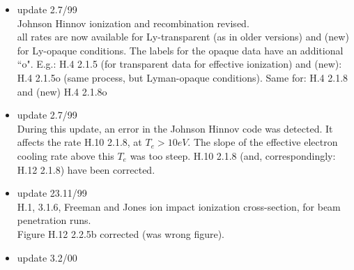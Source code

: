 \documentclass[12pt,dvipdfmx]{article}
\begin{document}
\begin{itemize}
  Fujimoto He-col.rad model revised.\\
  Form.II      ionization rate          H.4  2.3.9a, done \\
               elec. cooling rate  H.10 2.3.9a, done \\
              $\delta_E/ionis$     H.12 2.3.9a, done \\
  Form.I ionization rates revised. \\
   K1$\rightarrow$ K10=K1-K12-K13 \\
   K2$\rightarrow$ K20=K2-K21-K23 \\
   K3$\rightarrow$ K30=K3-K31-K32 \\
               H.4 2.3.9b, 2.3.9c 2.3.9d  redone \\
               (only 2.3.9b,K10, differs from earlier version)\\
               H.4 2.3.9e, 2.3.9f 2.3.9g  redone \\
               (only 2.3.9f,K20, differs from earlier version)\\
               H.4 2.3.9h, 2.3.9i 2.3.9j  redone \\
               (only 2.3.9j,K30, differs from earlier version)\\
 \item update   2.7/99 \\
  Johnson Hinnov ionization and recombination revised.\\
  all rates are now available for Ly-transparent (as in older versions)
  and (new) for Ly-opaque conditions. The labels for the opaque
  data have an additional ``o". E.g.: H.4 2.1.5 (for transparent
  data for effective ionization) and (new): H.4 2.1.5o (same process,
  but Lyman-opaque conditions). Same for: H.4 2.1.8 and (new) H.4 2.1.8o
 \item update   2.7/99 \\
  During this update, an error in the Johnson Hinnov code was detected.
  It affects the rate H.10 2.1.8, at $T_e > 10 eV$. The slope of the
  effective electron cooling rate above this $T_e$ was too steep.
  H.10 2.1.8  (and, correspondingly: H.12 2.1.8) have been corrected.
 \item update   23.11/99 \\
  H.1, 3.1.6, Freeman and Jones ion impact ionization cross-section,
  for beam penetration runs.\\
  Figure H.12 2.2.5b corrected (was wrong figure).
 \item update   3.2/00 \\

\end{itemize}
\end{document}
